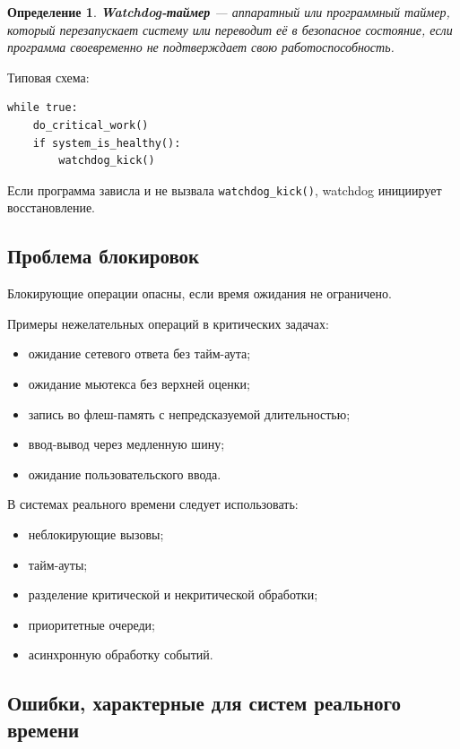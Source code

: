 \documentclass[12pt,a4paper]{article}
\newtheorem{definition}{Определение}
\begin{document}
\begin{definition}
\textbf{Watchdog-таймер} --- аппаратный или программный таймер, который перезапускает систему или переводит её в безопасное состояние, если программа своевременно не подтверждает свою работоспособность.
\end{definition}

Типовая схема:

\begin{verbatim}
while true:
    do_critical_work()
    if system_is_healthy():
        watchdog_kick()
\end{verbatim}

Если программа зависла и не вызвала \texttt{watchdog\_kick()}, watchdog инициирует восстановление.

\subsection{Проблема блокировок}

Блокирующие операции опасны, если время ожидания не ограничено.

Примеры нежелательных операций в критических задачах:
\begin{itemize}
    \item ожидание сетевого ответа без тайм-аута;
    \item ожидание мьютекса без верхней оценки;
    \item запись во флеш-память с непредсказуемой длительностью;
    \item ввод-вывод через медленную шину;
    \item ожидание пользовательского ввода.
\end{itemize}

В системах реального времени следует использовать:
\begin{itemize}
    \item неблокирующие вызовы;
    \item тайм-ауты;
    \item разделение критической и некритической обработки;
    \item приоритетные очереди;
    \item асинхронную обработку событий.
\end{itemize}

\subsection{Ошибки, характерные для систем реального времени}
\end{document}
